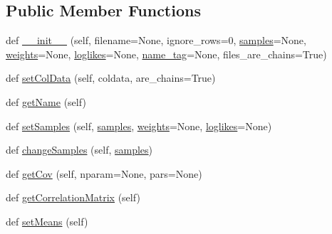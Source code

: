 \subsection*{Public Member Functions}
\begin{DoxyCompactItemize}
\item 
def \mbox{\hyperlink{classgetdist_1_1chains_1_1WeightedSamples_a418f3fb30b5d7a6815c1d455dc3c502c}{\+\_\+\+\_\+init\+\_\+\+\_\+}} (self, filename=None, ignore\+\_\+rows=0, \mbox{\hyperlink{classgetdist_1_1chains_1_1WeightedSamples_a4294526e2f75dc40e0cc1f3afd1c09ff}{samples}}=None, \mbox{\hyperlink{classgetdist_1_1chains_1_1WeightedSamples_a9465be88e1aedfe56830e8c730950d59}{weights}}=None, \mbox{\hyperlink{classgetdist_1_1chains_1_1WeightedSamples_afb971bef6eb53cba9bdc95aa2a2f4255}{loglikes}}=None, \mbox{\hyperlink{classgetdist_1_1chains_1_1WeightedSamples_ad33b233c472608ada6a0fe5d8e241aac}{name\+\_\+tag}}=None, files\+\_\+are\+\_\+chains=True)
\item 
def \mbox{\hyperlink{classgetdist_1_1chains_1_1WeightedSamples_a3d347a7823e4adc4e3f42bc5fd9a4162}{set\+Col\+Data}} (self, coldata, are\+\_\+chains=True)
\item 
def \mbox{\hyperlink{classgetdist_1_1chains_1_1WeightedSamples_acdd7cf1a0640abaf1c5d82ea345e031d}{get\+Name}} (self)
\item 
def \mbox{\hyperlink{classgetdist_1_1chains_1_1WeightedSamples_a94b1bddfee0767cad6fdca9c12a045d9}{set\+Samples}} (self, \mbox{\hyperlink{classgetdist_1_1chains_1_1WeightedSamples_a4294526e2f75dc40e0cc1f3afd1c09ff}{samples}}, \mbox{\hyperlink{classgetdist_1_1chains_1_1WeightedSamples_a9465be88e1aedfe56830e8c730950d59}{weights}}=None, \mbox{\hyperlink{classgetdist_1_1chains_1_1WeightedSamples_afb971bef6eb53cba9bdc95aa2a2f4255}{loglikes}}=None)
\item 
def \mbox{\hyperlink{classgetdist_1_1chains_1_1WeightedSamples_a653635d220dbf602c06118de80e224fe}{change\+Samples}} (self, \mbox{\hyperlink{classgetdist_1_1chains_1_1WeightedSamples_a4294526e2f75dc40e0cc1f3afd1c09ff}{samples}})
\item 
def \mbox{\hyperlink{classgetdist_1_1chains_1_1WeightedSamples_a8bdc8f5cf4d672d27a2c2d64eb2c8cc8}{get\+Cov}} (self, nparam=None, pars=None)
\item 
def \mbox{\hyperlink{classgetdist_1_1chains_1_1WeightedSamples_a1485368ae83e8f0586697c6080fd1025}{get\+Correlation\+Matrix}} (self)
\item 
def \mbox{\hyperlink{classgetdist_1_1chains_1_1WeightedSamples_a977e6b59952fb92233a9e2d330c984ad}{set\+Means}} (self)

\end{DoxyCompactItemize}
